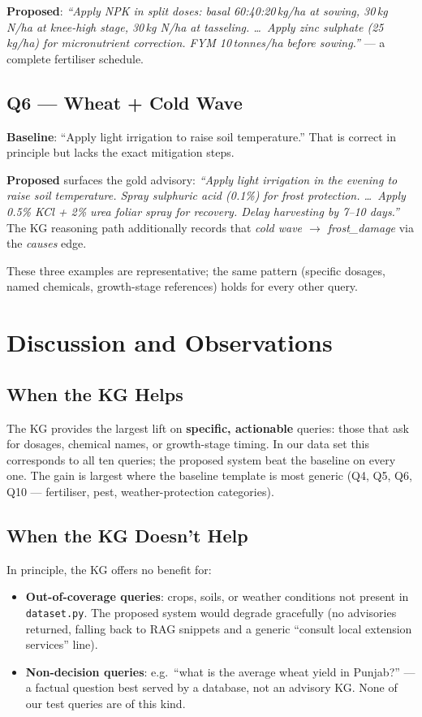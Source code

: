 \documentclass[11pt,a4paper]{article}
\begin{document}
\textbf{Proposed}: \emph{``Apply NPK in split doses: basal
60{:}40{:}20\,kg/ha at sowing, 30\,kg N/ha at knee-high stage,
30\,kg N/ha at tasseling. \ldots\ Apply zinc sulphate (25\,kg/ha) for
micronutrient correction. FYM 10\,tonnes/ha before sowing.''} --- a
complete fertiliser schedule.

\subsection{Q6 --- Wheat + Cold Wave}
\textbf{Baseline}: ``Apply light irrigation to raise soil
temperature.'' That is correct in principle but lacks the exact
mitigation steps.

\textbf{Proposed} surfaces the gold advisory: \emph{``Apply light
irrigation in the evening to raise soil temperature. Spray sulphuric
acid (0.1\%) for frost protection. \ldots\ Apply 0.5\% KCl + 2\% urea
foliar spray for recovery. Delay harvesting by 7--10 days.''} The KG
reasoning path additionally records that \emph{cold wave $\to$
frost\_damage} via the \textit{causes} edge.

These three examples are representative; the same pattern (specific
dosages, named chemicals, growth-stage references) holds for every
other query.

\section{Discussion and Observations}\label{sec:discussion}

\subsection{When the KG Helps}
The KG provides the largest lift on \textbf{specific, actionable}
queries: those that ask for dosages, chemical names, or growth-stage
timing. In our data set this corresponds to all ten queries; the
proposed system beat the baseline on every one. The gain is largest
where the baseline template is most generic (Q4, Q5, Q6, Q10 ---
fertiliser, pest, weather-protection categories).

\subsection{When the KG Doesn't Help}
In principle, the KG offers no benefit for:
\begin{itemize}[leftmargin=*]
  \item \textbf{Out-of-coverage queries}: crops, soils, or weather
        conditions not present in \texttt{dataset.py}. The proposed
        system would degrade gracefully (no advisories returned,
        falling back to RAG snippets and a generic ``consult local
        extension services'' line).
  \item \textbf{Non-decision queries}: e.g.\ ``what is the average
        wheat yield in Punjab?'' --- a factual question best served
        by a database, not an advisory KG. None of our test queries
        are of this kind.
\end{itemize}
\end{document}
